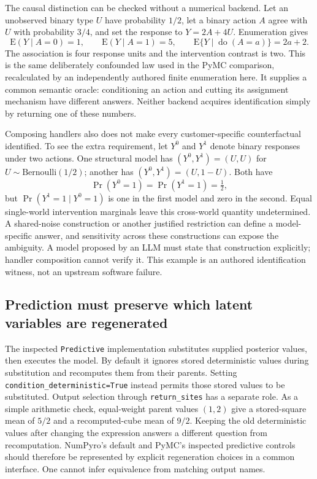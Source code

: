 The causal distinction can be checked without a numerical backend. Let an unobserved binary type $U$ have probability $1/2$, let a binary action $A$ agree with $U$ with probability $3/4$, and set the response to $Y=2A+4U$. Enumeration gives
\begin{equation}
 \mathrm{E}(Y\mid A=0)=1,\qquad
 \mathrm{E}(Y\mid A=1)=5,\qquad
 \mathrm{E}\{Y\mid\operatorname{do}(A=a)\}=2a+2.
\end{equation}
The association is four response units and the intervention contrast is two. This is the same deliberately confounded law used in the PyMC comparison, recalculated by an independently authored finite enumeration here. It supplies a common semantic oracle: conditioning an action and cutting its assignment mechanism have different answers. Neither backend acquires identification simply by returning one of these numbers. \cite{exec23_pymc_reference,exec23_numpyro_reference}

Composing handlers also does not make every customer-specific counterfactual identified. To see the extra requirement, let $Y^0$ and $Y^1$ denote binary responses under two actions. One structural model has $(Y^0,Y^1)=(U,U)$ for $U\sim\mathrm{Bernoulli}(1/2)$; another has $(Y^0,Y^1)=(U,1-U)$. Both have
\begin{equation}
 \Pr(Y^0=1)=\Pr(Y^1=1)=\tfrac12,
\end{equation}
but $\Pr(Y^1=1\mid Y^0=1)$ is one in the first model and zero in the second. Equal single-world intervention marginals leave this cross-world quantity undetermined. A shared-noise construction or another justified restriction can define a model-specific answer, and sensitivity across these constructions can expose the ambiguity. A model proposed by an LLM must state that construction explicitly; handler composition cannot verify it. This example is an authored identification witness, not an upstream software failure. \cite{exec23_numpyro_reference}

\subsection{Prediction must preserve which latent variables are regenerated}

The inspected \texttt{Predictive} implementation substitutes supplied posterior values, then executes the model. By default it ignores stored deterministic values during substitution and recomputes them from their parents. Setting \texttt{condition\_deterministic=True} instead permits those stored values to be substituted. Output selection through \texttt{return\_sites} has a separate role. As a simple arithmetic check, equal-weight parent values $(1,2)$ give a stored-square mean of $5/2$ and a recomputed-cube mean of $9/2$. Keeping the old deterministic values after changing the expression answers a different question from recomputation. NumPyro's default and PyMC's inspected predictive controls should therefore be represented by explicit regeneration choices in a common interface. One cannot infer equivalence from matching output names. \cite{exec23_numpyro_sources,exec23_pymc_sources,exec23_numpyro_reference}

